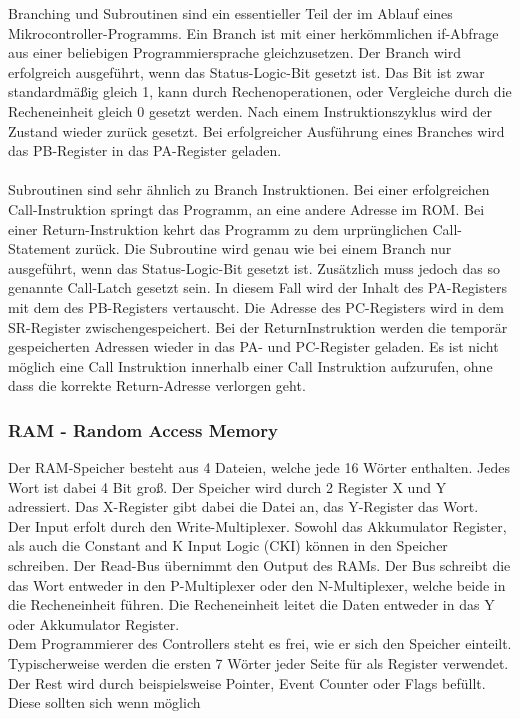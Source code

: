 Branching und Subroutinen sind ein essentieller Teil der im Ablauf eines Mikrocontroller-Programms. Ein Branch ist mit einer herk{\"o}mmlichen if-Abfrage aus einer beliebigen Programmiersprache gleichzusetzen. Der Branch wird erfolgreich ausgef{\"u}hrt, wenn das Status-Logic-Bit gesetzt ist. Das Bit ist zwar standardm{\"a}{\ss}ig gleich 1, kann durch Rechenoperationen, oder Vergleiche durch die Recheneinheit gleich 0 gesetzt werden. Nach einem Instruktionszyklus wird der Zustand wieder zur{\"u}ck gesetzt. Bei erfolgreicher Ausf{\"u}hrung eines Branches wird das PB-Register in das PA-Register geladen. \\
\\
Subroutinen sind sehr {\"a}hnlich zu Branch Instruktionen. Bei einer erfolgreichen Call-Instruktion springt das Programm, an eine andere Adresse im ROM. Bei einer Return-Instruktion kehrt das Programm zu dem urpr{\"u}nglichen Call-Statement zur{\"u}ck. Die Subroutine wird genau wie bei einem Branch nur ausgef{\"u}hrt, wenn das Status-Logic-Bit gesetzt ist. Zus{\"a}tzlich muss jedoch das so genannte Call-Latch gesetzt sein. In diesem Fall wird der Inhalt des PA-Registers mit dem des PB-Registers vertauscht. Die Adresse des PC-Registers wird in dem SR-Register zwischengespeichert. Bei der ReturnInstruktion werden die tempor{\"a}r gespeicherten Adressen wieder in das PA- und PC-Register geladen. Es ist nicht m{\"o}glich eine Call Instruktion innerhalb einer Call Instruktion aufzurufen, ohne dass die korrekte Return-Adresse verlorgen geht.

\subsubsection{RAM - Random Access Memory}

Der RAM-Speicher besteht aus 4 Dateien, welche jede 16 W{\"o}rter enthalten. Jedes Wort ist dabei 4 Bit gro{\ss}. Der Speicher wird durch 2 Register X und Y adressiert. Das X-Register gibt dabei die Datei an, das Y-Register das Wort.\\
Der Input erfolt durch den Write-Multiplexer. Sowohl das Akkumulator Register, als auch die Constant and K Input Logic (CKI) k{\"o}nnen in den Speicher schreiben. Der Read-Bus {\"u}bernimmt den Output des RAMs. Der Bus schreibt die das Wort entweder in den P-Multiplexer oder den N-Multiplexer, welche beide in die Recheneinheit f{\"u}hren. Die Recheneinheit leitet die Daten entweder in das Y oder Akkumulator Register. \\
Dem Programmierer des Controllers steht es frei, wie er sich den Speicher einteilt. Typischerweise werden die ersten 7 W{\"o}rter jeder Seite f{\"u}r als Register verwendet. Der Rest wird durch beispielsweise Pointer, Event Counter oder Flags bef{\"u}llt. Diese sollten sich wenn m{\"o}glich



